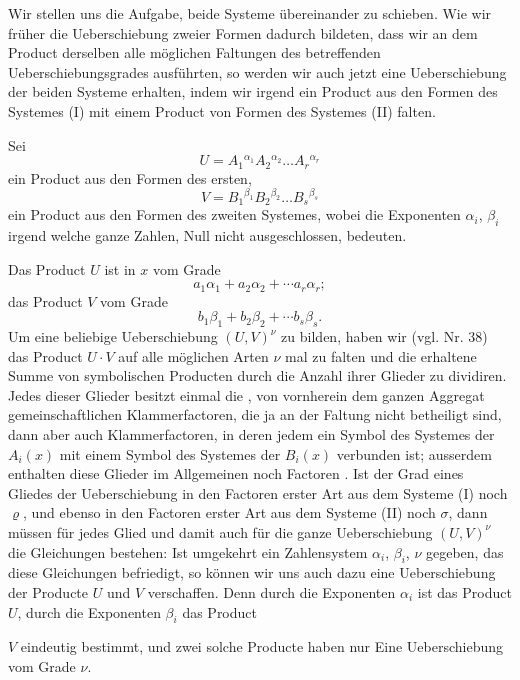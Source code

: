 Wir stellen uns die Aufgabe, beide Systeme \"ubereinander zu schieben. Wie wir fr\"uher die Ueberschiebung zweier Formen dadurch bildeten, dass wir an dem Product derselben alle m\"oglichen Faltungen des betreffenden Ueberschiebungsgrades ausf\"uhrten, so werden wir auch jetzt eine Ueberschiebung der beiden Systeme erhalten, indem wir irgend ein Product aus den Formen des Systemes (I) mit einem Product von Formen des Systemes (II) falten.

Sei
\[
U = A_1{}^{\alpha_1} A_2{}^{\alpha_2} \ldots A_r{}^{\alpha_r}
\]
ein Product aus den Formen des ersten,
\[
V = B_1{}^{\beta_1} B_2{}^{\beta_2} \ldots B_s{}^{\beta_s}
\]
ein Product aus den Formen des zweiten Systemes, wobei die Exponenten $\alpha_i$, $\beta_i$ irgend welche ganze Zahlen, Null nicht ausgeschlossen, bedeuten.

Das Product $U$ ist in $x$ vom Grade
\[
a_1 \alpha_1 + a_2 \alpha_2 + \cdots a_r \alpha_r;
\]
das Product $V$ vom Grade
\[
b_1 \beta_1 + b_2 \beta_2 + \cdots b_s \beta_s.
\]
Um eine beliebige Ueberschiebung $(U, V)^{\nu}$ zu bilden, haben wir (vgl. Nr. 38) das Product $U \cdot V$ auf alle m\"oglichen Arten $\nu$ mal zu falten und die erhaltene Summe von symbolischen Producten durch die Anzahl ihrer Glieder zu dividiren. Jedes dieser Glieder besitzt einmal die , von vornherein dem ganzen Aggregat gemeinschaftlichen Klammerfactoren, die ja an der Faltung nicht betheiligt sind, dann aber auch  Klammerfactoren, in deren jedem ein Symbol des Systemes der $A_i(x)$ mit einem Symbol des Systemes der $B_i(x)$ verbunden ist; ausserdem enthalten diese Glieder im Allgemeinen noch Factoren . Ist der Grad eines Gliedes der Ueberschiebung in den Factoren erster Art aus dem Systeme (I) noch $\varrho$, und ebenso in den Factoren erster Art aus dem Systeme (II) noch $\sigma$, dann m\"ussen f\"ur jedes Glied und damit auch f\"ur die ganze Ueberschiebung $(U, V)^{\nu}$ die Gleichungen bestehen:
Ist umgekehrt ein Zahlensystem $\alpha_i$, $\beta_i$, $\nu$ gegeben, das diese Gleichungen befriedigt, so k\"onnen wir uns auch dazu eine Ueberschiebung der Producte $U$ und $V$ verschaffen. Denn durch die Exponenten $\alpha_i$ ist das Product $U$, durch die Exponenten $\beta_i$ das Product


$V$ eindeutig bestimmt, und zwei solche Producte haben nur Eine Ueberschiebung vom Grade $\nu$.

